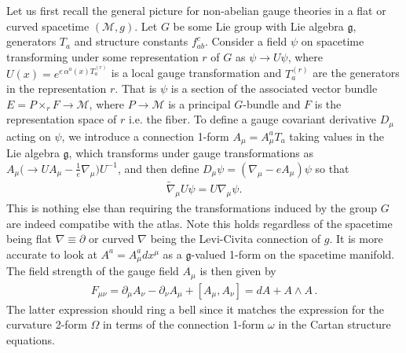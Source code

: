 \documentclass[../geometry_main.tex]{subfiles}
\begin{document}
Let us first recall the general picture for non-abelian gauge theories in a flat or curved spacetime $(\mathcal{M},g)$.
Let $G$ be some Lie group with Lie algebra $\mathfrak{g}$, generators $T_a$ and structure constants $f_{ab}^c$.
Consider a field $\psi$ on spacetime transforming under some representation $r$ of $G$ as $\psi \to U \psi$, where $U(x) = e^{e\,\alpha^a(x) T_a^{(r)}}$ is a local gauge transformation and $T_a^{(r)}$ are the generators in the representation $r$.
That is $\psi$ is a section of the associated vector bundle $E = P \times_r F \to \mathcal{M}$, where $P\to \mathcal{M}$ is a principal $G$-bundle and $F$ is the representation space of $r$ i.e. the fiber.
To define a gauge covariant derivative $D_\mu$ acting on $\psi$, we introduce a connection 1-form $A_\mu = A_\mu^a T_a$ taking values in the Lie algebra $\mathfrak{g}$, which transforms under gauge transformations as $A_\mu \big(\to U A_\mu -\tfrac{1}{e} \nabla_\mu \big)U^{-1}$, and then define $D_\mu \psi = (\nabla_\mu - e A_\mu)\psi$ so that
\begin{align}
    \tilde{\nabla}_\mu U\psi = U \nabla_\mu \psi.
\end{align}
This is nothing else than requiring the transformations induced by the group $G$ are indeed compatibe with the atlas.
Note this holds regardless of the spacetime being flat $\nabla\equiv \partial$ or curved $\nabla$ being the Levi-Civita connection of $g$.
It is more accurate to look at $A^a=A^a_\mu dx^\mu$ as a $\mathfrak{g}$-valued 1-form on the spacetime manifold.
The field strength of the gauge field $A_\mu$ is then given by
\begin{align}
    F_{\mu\nu} = \partial_\mu A_\nu - \partial_\nu A_\mu + [A_\mu, A_\nu] = dA +  A \wedge A\,.
\end{align}
The latter expression should ring a bell since it matches the expression for the curvature 2-form $\Omega$ in terms of the connection 1-form $\omega$ in the Cartan structure equations.
\end{document}
